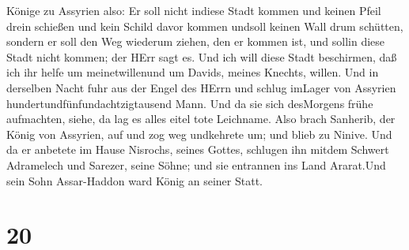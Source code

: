 Könige zu Assyrien also: Er soll nicht indiese Stadt kommen und keinen
Pfeil drein schießen und kein Schild davor kommen undsoll keinen Wall
drum schütten,  sondern er soll den Weg wiederum ziehen,
den er kommen ist, und sollin diese Stadt nicht kommen; der HErr sagt
es.  Und ich will diese Stadt beschirmen, daß ich ihr helfe
um meinetwillenund um Davids, meines Knechts, willen.  Und
in derselben Nacht fuhr aus der Engel des HErrn und schlug imLager von
Assyrien hundertundfünfundachtzigtausend Mann. Und da sie sich
desMorgens frühe aufmachten, siehe, da lag es alles eitel tote
Leichname.  Also brach Sanherib, der König von Assyrien,
auf und zog weg undkehrete um; und blieb zu Ninive.  Und da
er anbetete im Hause Nisrochs, seines Gottes, schlugen ihn mitdem
Schwert Adramelech und Sarezer, seine Söhne; und sie entrannen ins Land
Ararat.Und sein Sohn Assar-Haddon ward König an seiner Statt.

\hypertarget{section-19}{%
\section{20}\label{section-19}}


